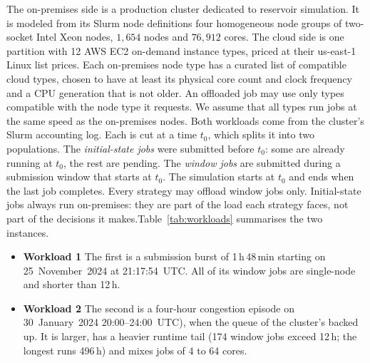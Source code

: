 \documentclass[conference]{IEEEtran}
\begin{document}
The on-premises side is a production cluster dedicated to reservoir simulation. It is modeled from its Slurm node definitions four homogeneous node groups of two-socket Intel Xeon nodes,
$1{,}654$ nodes and $76{,}912$ cores. The cloud side is one partition with 12 AWS EC2 on-demand instance types, priced at their us-east-1 Linux list prices. Each on-premises node type has a curated list of compatible cloud types, chosen to have at least its physical core count and clock frequency and a CPU generation that is not older. An offloaded job may use only types compatible with the node type it requests. We assume that all types run jobs at the same
speed as the on-premises nodes. 
Both workloads come from the cluster's Slurm accounting log. Each is cut at a time $t_0$, which splits it into two populations. The \emph{initial-state jobs} were submitted before $t_0$: some are already running at $t_0$, the rest are pending. The \emph{window jobs} are submitted during a submission window that starts at $t_0$. The simulation starts at $t_0$ and ends when the last job completes. Every strategy may offload window jobs only. Initial-state jobs
always run on-premises: they are part of the load each strategy faces, not part of the decisions it makes.Table~\ref{tab:workloads} summarises the two
instances.

\begin{itemize}
  \item \textbf{Workload 1} The first is a submission burst of 1\,h\,48\,min starting on 25~November~2024 at 21:17:54~UTC. All of its window jobs are single-node and shorter than 12\,h.
  \item \textbf{Workload 2} The second is a four-hour congestion episode on 30~January~2024  20:00--24:00~UTC), when the queue of the cluster's backed up. It is larger, has a heavier runtime tail (174 window jobs exceed 12\,h; the  longest runs 496\,h) and mixes jobs of 4 to 64 cores.
\end{itemize}
\end{document}
